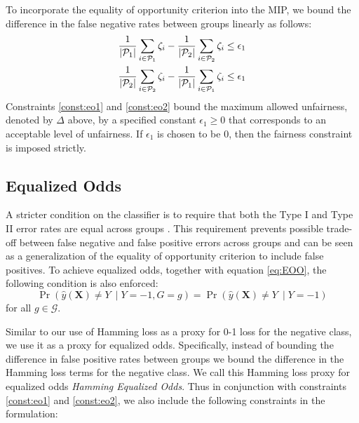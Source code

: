 \documentclass[twoside,11pt]{article}
\begin{document}
To incorporate the equality of opportunity criterion into the MIP, we bound the difference in the false negative rates between groups linearly as follows: 
	\begin{align}
	\frac{1}{\lvert\mathcal{P}_1\rvert}\sum_{i \in  \mathcal{P}_1 } \zeta_i 
	        - \frac{1}{\lvert\mathcal{P}_2\rvert}\sum_{i \in  \mathcal{P}_2} \zeta_i &\leq \epsilon_1 \label{const:eo1}\\
	 \frac{1}{\lvert\mathcal{P}_2\rvert}\sum_{i \in  \mathcal{P}_2} \zeta_i 
	        - \frac{1}{\lvert\mathcal{P}_1\rvert}\sum_{i \in  \mathcal{P}_1} \zeta_i&\leq \epsilon_1 \label{const:eo2}
	\end{align}
Constraints \eqref{const:eo1} and \eqref{const:eo2} bound the maximum allowed unfairness, denoted by $\Delta$ above, by a specified constant $\epsilon_1\ge 0$ that corresponds to an acceptable  level of unfairness. If $\epsilon_1$ is chosen to be 0, then the fairness constraint is imposed strictly.

\subsection{Equalized Odds} 
A stricter condition on the classifier is to require that both the Type I and Type II error rates are equal across groups \citep{hardt2016equality}.  
This requirement prevents possible trade-off between false negative and false positive errors across groups and can be seen as a generalization of the equality of opportunity criterion to include false positives. 
To achieve equalized odds, together with equation \eqref{eq:EOO}, the following condition is also enforced:
   	\begin{equation*} 
    \Pr(\hat{y}(\textbf{X}) \neq Y ~ \mid Y = -1, G = g) = \Pr(\hat{y}(\textbf{X}) \neq Y ~ \mid Y = -1)  
    \end{equation*}
for all $ g\in \mathcal{G}$. 

Similar to our use of Hamming loss as a proxy for 0-1 loss for the negative class, we use it as a proxy for equalized odds. Specifically, instead of bounding the difference in false positive rates between groups we bound the difference in the Hamming loss terms for the negative class. We call this Hamming loss proxy for equalized odds \textit{Hamming Equalized Odds}. Thus in conjunction with constraints \eqref{const:eo1} and \eqref{const:eo2}, we also include the following constraints in the formulation:
\end{document}
